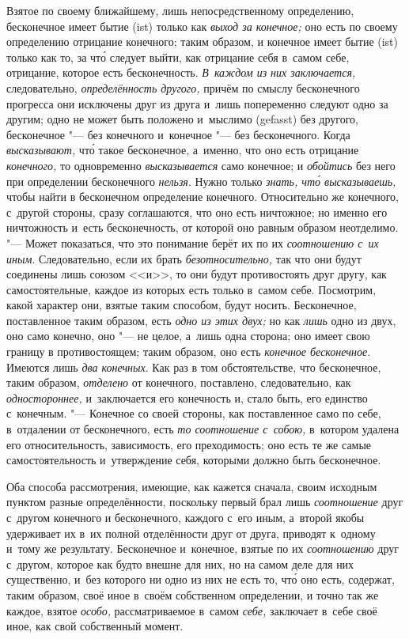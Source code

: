 Взятое по своему ближайшему, лишь непосредственному определению, бесконечное
имеет бытие (ist) только как {\em выход за конечное;}
оно есть по своему определению отрицание конечного; таким образом, и
конечное имеет бытие (ist) только как то, за чт\'{о} следует выйти, как
отрицание себя в~самом себе, отрицание, которое есть бесконечность.
{\em В~каждом из них заключается,} следовательно,
{\em определённость другого,} причём по смыслу
бесконечного прогресса они исключены друг из друга и~лишь попеременно
следуют одно за другим; одно не может быть положено и~мыслимо (gefasst) без
другого, бесконечное "--- без конечного и~конечное "--- без бесконечного. Когда
{\em высказывают,} чт\'{о} такое бесконечное, а~именно, что
оно есть отрицание {\em конечного,} то одновременно
{\em высказывается} само конечное; и
{\em обойтись} без него при определении бесконечного
{\em нельзя}. Нужно только
{\em знать, чт\'{о} высказываешь,} чтобы найти в
бесконечном определение конечного. Относительно же конечного, с~другой
стороны, сразу соглашаются, что оно есть ничтожное; но именно его
ничтожность и~есть бесконечность, от которой оно равным образом неотделимо.
"--- Может показаться, что это понимание берёт их по их
{\em соотношению с~их иным}. Следовательно, если их
брать {\em безотносительно,} так что они будут
соединены лишь союзом <<и>>, то они будут противостоять друг другу, как
самостоятельные, каждое из которых есть только в~самом себе. Посмотрим,
какой характер они, взятые таким способом, будут носить. Бесконечное,
поставленное таким образом, есть {\em одно из этих
двух;} но как {\em лишь} одно из двух, оно само
конечно, оно "--- не целое, а~лишь одна сторона; оно имеет свою границу в
противостоящем; таким образом, оно есть {\em конечное
бесконечное}. Имеются лишь {\em два конечных}. Как раз
в том обстоятельстве, что бесконечное, таким образом,
{\em отделено} от конечного, поставлено, следовательно,
как {\em одностороннее,} и~заключается его конечность
и, стало быть, его единство с~конечным. "--- Конечное со своей стороны, как
поставленное само по себе, в~отдалении от бесконечного, есть
{\em то соотношение с~собою,} в~котором удалена его
относительность, зависимость, его преходимость; оно есть те же самые
самостоятельность и~утверждение себя, которыми должно быть бесконечное.

Оба способа рассмотрения, имеющие, как кажется сначала, своим исходным
пунктом разные определённости, поскольку первый брал лишь
{\em соотношение} друг с~другом конечного и
бесконечного, каждого с~его иным, а~второй якобы удерживает их в~их
полной отделённости друг от друга, приводят к~одному и~тому же результату.
Бесконечное и~конечное, взятые по их {\em соотношению}
друг с~другом, которое как будто внешне для них, но на самом деле для них
существенно, и~без которого ни одно из них не есть то, чт\'{о} оно есть,
содержат, таким образом, своё иное в~своём собственном определении, и
точно так же каждое, взятое {\em особо,}
рассматриваемое в~самом {\em себе,} заключает в~себе
своё иное, как свой собственный момент.

